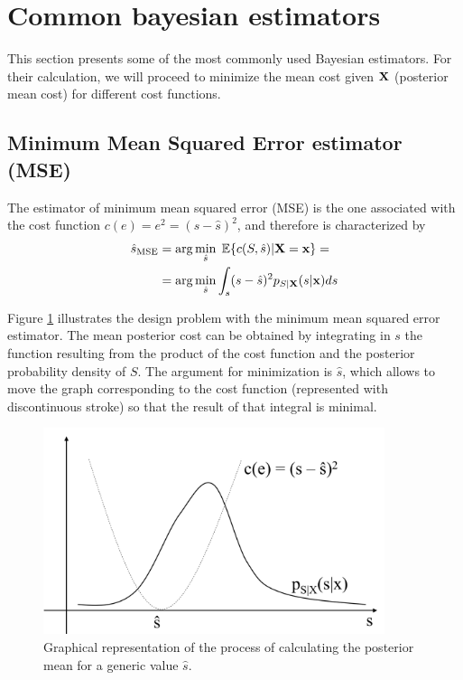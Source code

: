 \section{Common bayesian estimators}

This section presents some of the most commonly used Bayesian estimators. For their calculation, we will proceed to minimize the mean cost given $\bf X$ (posterior mean cost) for different cost functions.


\subsection{Minimum Mean Squared Error estimator (MSE)}
The estimator of minimum mean squared error (MSE) is the one associated with the cost function $c(e) = e^2 = (s-\hat s)^2$, and therefore is characterized by 
\begin{align}
\label{ec:coste_medio_cuadratico}
\hat s_{\text{MSE}} 
  & = \arg\min_{\hat s} \; \mathbb{E}\{c(S,\hat s)|{\bf X} = {\bf x} \} = \\
  & = \arg\min_{\hat s} \int_s (s - \hat s)^2 p_{S|{\bf X}}(s|{\bf x}) ds
\end{align}

Figure \ref{fig:estimador_cuadratico} illustrates the design problem with the minimum mean squared error estimator. The mean posterior cost can be obtained by integrating in $s$ the function resulting from the product of the cost function and the posterior probability density of $S$. The argument for minimization is $\hat s$, which allows to move the graph corresponding to the cost function (represented with discontinuous stroke) so that the result of that integral is minimal.

\begin{figure}[th]
  \begin{center}
    \includegraphics[width=10cm]{Figures//estimador_cuadratico.png}
    \caption{Graphical representation of the process of calculating the posterior mean for a generic value $\hat{s}$.}
    \label{fig:estimador_cuadratico}
  \end{center}
\end{figure}

